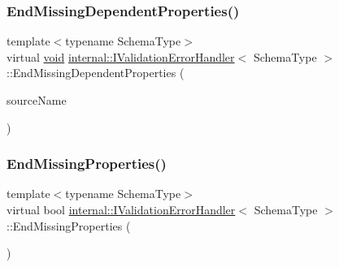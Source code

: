 \mbox{\label{classinternal_1_1IValidationErrorHandler_a05af3199b8011a3476dfd238fa958213}} 
\subsubsection{\texorpdfstring{End\+Missing\+Dependent\+Properties()}{EndMissingDependentProperties()}}
{\footnotesize\ttfamily template$<$typename Schema\+Type$>$ \\
virtual \hyperlink{imgui__impl__opengl3__loader_8h_ac668e7cffd9e2e9cfee428b9b2f34fa7}{void} \hyperlink{classinternal_1_1IValidationErrorHandler}{internal\+::\+I\+Validation\+Error\+Handler}$<$ Schema\+Type $>$\+::End\+Missing\+Dependent\+Properties (\begin{DoxyParamCaption}\item[{const \hyperlink{classinternal_1_1IValidationErrorHandler_a22eda6c4ea9537f1ba00d76af052649a}{S\+Value} \&}]{source\+Name }\end{DoxyParamCaption})\hspace{0.3cm}{\ttfamily [pure virtual]}}

\mbox{\label{classinternal_1_1IValidationErrorHandler_a3a01eec1a969cfb600340a2bad157c9c}} 
\subsubsection{\texorpdfstring{End\+Missing\+Properties()}{EndMissingProperties()}}
{\footnotesize\ttfamily template$<$typename Schema\+Type$>$ \\
virtual bool \hyperlink{classinternal_1_1IValidationErrorHandler}{internal\+::\+I\+Validation\+Error\+Handler}$<$ Schema\+Type $>$\+::End\+Missing\+Properties (\begin{DoxyParamCaption}{ }\end{DoxyParamCaption})\hspace{0.3cm}{\ttfamily [pure virtual]}}



